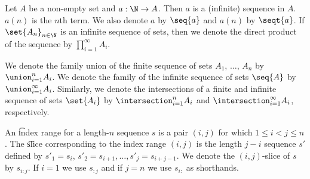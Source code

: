 
Let $A$ be a non-empty set and $a: \N \to A$.
Then $a$ is a (infinite) sequence in $A$.
$a(n)$ is the $n$th term.
We also denote $a$ by $\seq{a}$ and $a(n)$ by $\seqt{a}$.
If $\set{A_n}_{n \in \N}$ is an infinite sequence of sets, then we denote the direct product of the sequence by $\prod_{i = 1}^{\infty} A_i$.


We denote the family union of the finite sequence of sets $A_1$, $\dots$, $A_n$ by $\union_{i = 1}^{n} A_i$.
We denote the family of the infinite sequence of sets $\seq{A}$ by $\union_{i = 1}^{\infty} A_i$.
Similarly, we denote the intersections of a finite and infinite sequence of sets $\set{A_i}$ by $\intersection_{i = 1}^{n} A_i$ and $\intersection_{i = 1}^{\infty} A_i$, respectively.



An \t{index range} for a length-$n$ sequence $s$ is a pair $(i, j)$ for which $1 \leq i < j \leq n$.
The \t{slice} corresponding to the index range $(i,j)$ is the length $j-i$ sequence $s'$ defined by $s'_1 = s_{i}$, $s'_2 = s_{i+1}, \dots, s'_{j} = s_{i + j-1}$.
We denote the $(i,j)$-slice of $s$ by $s_{i:j}$.
If $i = 1$ we use $s_{:j}$ and if $j = n$ we use $s_{i:}$ as shorthands.



%



%
%
%
%
%
